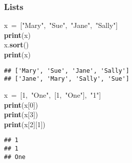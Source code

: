 \documentclass{beamer}\usepackage[]{graphicx}\usepackage[]{color}
\makeatletter
\newcommand{\hlnum}[1]{\textcolor[rgb]{0.686,0.059,0.569}{#1}}%
\newcommand{\hlstr}[1]{\textcolor[rgb]{0.192,0.494,0.8}{#1}}%
\newcommand{\hlopt}[1]{\textcolor[rgb]{0,0,0}{#1}}%
\newcommand{\hlstd}[1]{\textcolor[rgb]{0.345,0.345,0.345}{#1}}%
\newcommand{\hlkwa}[1]{\textcolor[rgb]{0.161,0.373,0.58}{\textbf{#1}}}%
\newcommand{\hlkwd}[1]{\textcolor[rgb]{0.737,0.353,0.396}{\textbf{#1}}}%
\newenvironment{kframe}{%
 \def\at@end@of@kframe{}%
 \ifinner\ifhmode%
  \def\at@end@of@kframe{\end{minipage}}%
  \begin{minipage}{\columnwidth}%
 \fi\fi%
 \def\FrameCommand##1{\hskip\@totalleftmargin \hskip-\fboxsep
 \colorbox{shadecolor}{##1}\hskip-\fboxsep
     \hskip-\linewidth \hskip-\@totalleftmargin \hskip\columnwidth}%
 \MakeFramed {\advance\hsize-\width
   \@totalleftmargin\z@ \linewidth\hsize
   \@setminipage}}%
 {\par\unskip\endMakeFramed%
 \at@end@of@kframe}
\newenvironment{knitrout}{}{} %
\makeatother
\begin{document}
\begin{frame}[fragile]
\frametitle{Lists}
\begin{knitrout}
\color{fgcolor}\begin{kframe}
\noindent
\ttfamily
\hlstd{x\ }\hlopt{=\ {[}}\hlstd{}\hlstr{"Mary"}\hlstd{}\hlopt{,\ }\hlstd{}\hlstr{"Sue"}\hlstd{}\hlopt{,\ }\hlstd{}\hlstr{"Jane"}\hlstd{}\hlopt{,\ }\hlstd{}\hlstr{"Sally"}\hlstd{}\hlopt{{]}}\hspace*{\fill}\\
\hlstd{}\hlkwa{print}\hlstd{}\hlopt{(}\hlstd{x}\hlopt{)}\hspace*{\fill}\\
\hlstd{x}\hlopt{.}\hlstd{}\hlkwd{sort}\hlstd{}\hlopt{()}\hspace*{\fill}\\
\hlstd{}\hlkwa{print}\hlstd{}\hlopt{(}\hlstd{x}\hlopt{)}\hlstd{}\hspace*{\fill}
\mbox{}
\normalfont

\begin{verbatim}
## ['Mary', 'Sue', 'Jane', 'Sally']
## ['Jane', 'Mary', 'Sally', 'Sue']
\end{verbatim}
\end{kframe}
\end{knitrout}

\begin{knitrout}
\color{fgcolor}\begin{kframe}
\noindent
\ttfamily
\hlstd{x\ }\hlopt{=\ {[}}\hlstd{}\hlnum{1}\hlstd{}\hlopt{,\ }\hlstd{}\hlstr{"One"}\hlstd{}\hlopt{,\ {[}}\hlstd{}\hlnum{1}\hlstd{}\hlopt{,\ }\hlstd{}\hlstr{"One"}\hlstd{}\hlopt{{]},\ }\hlstd{}\hlstr{"1"}\hlstd{}\hlopt{{]}}\hspace*{\fill}\\
\hlstd{}\hlkwa{print}\hlstd{}\hlopt{(}\hlstd{x}\hlopt{{[}}\hlstd{}\hlnum{0}\hlstd{}\hlopt{{]})}\hspace*{\fill}\\
\hlstd{}\hlkwa{print}\hlstd{}\hlopt{(}\hlstd{x}\hlopt{{[}}\hlstd{}\hlnum{3}\hlstd{}\hlopt{{]})}\hspace*{\fill}\\
\hlstd{}\hlkwa{print}\hlstd{}\hlopt{(}\hlstd{x}\hlopt{{[}}\hlstd{}\hlnum{2}\hlstd{}\hlopt{{]}{[}}\hlstd{}\hlnum{1}\hlstd{}\hlopt{{]})}\hlstd{}\hspace*{\fill}
\mbox{}
\normalfont

\begin{verbatim}
## 1
## 1
## One
\end{verbatim}
\end{kframe}
\end{knitrout}
\end{frame}
\end{document}
